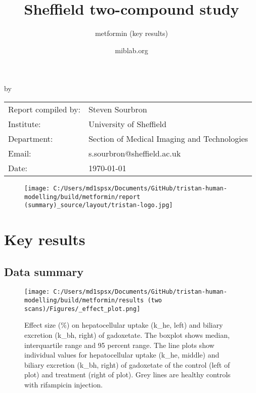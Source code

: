 \documentclass{epflreport}%
\begin{document}
%
\normalsize%
\frontmatter%
\title{Sheffield two{-}compound study}%
\subtitle{metformin (key results)}%
\author{miblab.org}%
\subject{D2.13 {-} Internal report}%
%
%
%
\makecover%
\begin{titlepage}%
\begin{center}%
\makeatletter%
\largetitlestyle\fontsize{45}{45}\selectfont\@title%
\makeatother%
\linebreak%
\makeatletter%
\ifdefvoid{\@subtitle}{}{\bigskip\titlestyle\fontsize{20}{20}\selectfont\@subtitle}%
\makeatother%
\linebreak%
\bigskip%
\bigskip%
by%
\linebreak%
\bigskip%
\bigskip%
\makeatletter%
\largetitlestyle\fontsize{25}{25}\selectfont\@author%
\makeatother%
\vfill%
\large%
\begin{tabular}{ll}%
\hline%
Report compiled by: &Steven Sourbron\\%
Institute: &University of Sheffield\\%
Department: &Section of Medical Imaging and Technologies\\%
Email: &s.sourbron@sheffield.ac.uk\\%
Date: &\today\\%
\hline%
\end{tabular}%


\begin{figure}[b!]%
\centering%
\centering%
\texttt{[image: C:/Users/md1spsx/Documents/GitHub/tristan-human-modelling/build/metformin/report (summary)\_source/layout/tristan-logo.jpg]}%
\end{figure}

%
\end{center}%
\end{titlepage}%
\newpage%
\tableofcontents%
\mainmatter%
\clearpage%
\chapter{Key results}%
\section{Data summary}%
\label{sec:Datasummary}%

%


\begin{figure}[h!]%
\centering%
\texttt{[image: C:/Users/md1spsx/Documents/GitHub/tristan-human-modelling/build/metformin/results (two scans)/Figures/\_effect\_plot.png]}%
\caption{Effect size (\%) on hepatocellular uptake (k\_he, left) and biliary excretion (k\_bh, right) of gadoxetate. The boxplot shows median, interquartile range and 95 percent range. The line plots show individual values for hepatocellular uptake (k\_he, middle) and biliary excretion (k\_bh, right) of gadoxetate of the control (left of plot) and treatment (right of plot). Grey lines are healthy controls with rifampicin injection.}%
\end{figure}
\end{document}
